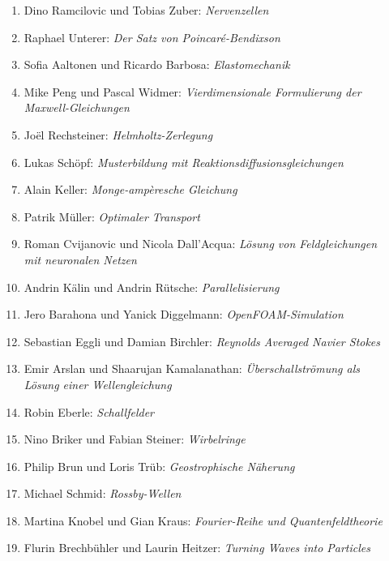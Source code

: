 \documentclass[handout]{beamer}
\begin{document}
\begin{frame}
\begin{columns}[t,onlytextwidth]
\begin{column}{0.60\textwidth}
\begin{description}
\begin{enumerate}
\item Dino Ramcilovic und Tobias Zuber: {\em Nervenzellen}
\item Raphael Unterer: {\em Der Satz von Poincaré-Bendixson}
\item Sofia Aaltonen und Ricardo Barbosa: {\em Elastomechanik}
\item Mike Peng und Pascal Widmer: {\em Vierdimensionale Formulierung der Maxwell-Gleichungen}
\setcounter{enumi}{19}
\item Joël Rechsteiner: {\em Helmholtz-Zerlegung}
\item Lukas Schöpf: {\em Musterbildung mit Reaktionsdiffusionsgleichungen}
\item Alain Keller: {\em Monge-ampèresche Gleichung}
\item Patrik Müller: {\em Optimaler Transport}
\item Roman Cvijanovic und Nicola Dall'Acqua:
{\em Lösung von Feldgleichungen mit neuronalen Netzen}
\item Andrin Kälin und Andrin Rütsche: {\em Parallelisierung}
\item Jero Barahona und Yanick Diggelmann: {\em OpenFOAM-Simulation}
\item Sebastian Eggli und Damian Birchler: {\em Reynolds Averaged Navier Stokes}
\item Emir Arslan und Shaarujan Kamalanathan:
{\em Überschallströmung als Lösung einer Wellengleichung}
\item Robin Eberle: {\em Schallfelder}
\item Nino Briker und Fabian Steiner: {\em Wirbelringe}
\item Philip Brun und Loris Trüb: {\em Geostrophische Näherung}
\item Michael Schmid: {\em Rossby-Wellen}
\item Martina Knobel und Gian Kraus: {\em Fourier-Reihe und Quantenfeldtheorie}
\item Flurin Brechbühler und Laurin Heitzer: {\em Turning Waves into Particles}
\end{enumerate}
\end{description}
\end{column}
\begin{column}{0.01\textwidth}
\end{column}
\end{columns}
\end{frame}
\end{document}
